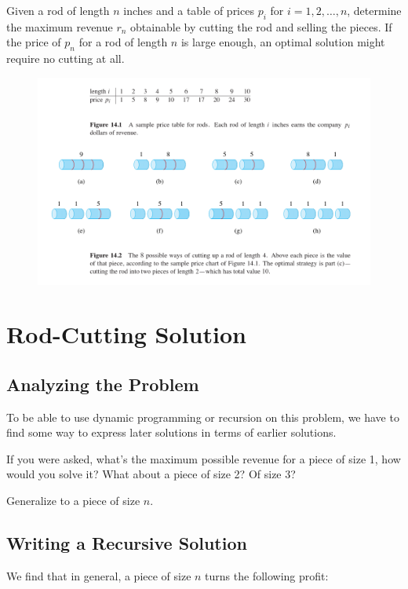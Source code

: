 \documentclass[]{article}
\begin{document}
Given a rod of length $n$ inches and a table of prices $p_i$ for $i = 1, 2, \ldots, n$, determine the maximum revenue $r_n$ obtainable by cutting the rod and selling the pieces. If the price of $p_n$ for a rod of length $n$ is large enough, an optimal solution might require no cutting at all. 

\begin{figure}
    \includegraphics[width=\textwidth]{rod-ex.png}
\end{figure}

\section*{Rod-Cutting Solution}

\subsection*{Analyzing the Problem}

To be able to use dynamic programming or recursion on this problem, we have to find some way to express later solutions in terms of earlier solutions.

If you were asked, what's the maximum possible revenue for a piece of size 1, how would you solve it? What about a piece of size 2? Of size 3?

Generalize to a piece of size $n$. 

\subsection*{Writing a Recursive Solution}

We find that in general, a piece of size $n$ turns the following profit:
\end{document}
